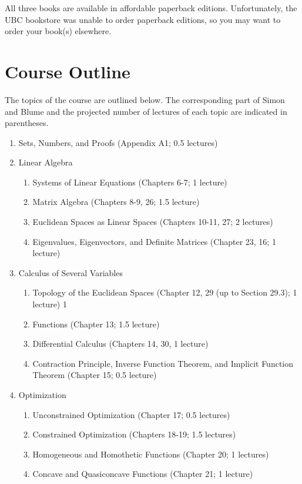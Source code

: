 \documentclass[10pt]{article}
\begin{document}
All three books are available in affordable paperback
editions. Unfortunately, the UBC bookstore was unable to order
paperback editions, so you may want to order your book(s) elsewhere. 

\section{Course Outline}

The topics of the course are outlined below. The corresponding part of
Simon and Blume and the projected number of lectures of each topic are
indicated in parentheses.
\begin{enumerate}
\item Sets, Numbers, and Proofs (Appendix A1; 0.5 lectures)
\item Linear Algebra
  \begin{enumerate}
  \item Systems of Linear Equations (Chapters 6-7; 1 lecture)
  \item Matrix Algebra (Chapters 8-9, 26; 1.5 lecture)
  \item Euclidean Spaces as Linear Spaces (Chapters 10-11, 27; 2
    lectures)
  \item Eigenvalues, Eigenvectors, and Definite Matrices (Chapter 23,
    16; 1 lecture)
  \end{enumerate}
\item Calculus of Several Variables
  \begin{enumerate}
  \item Topology of the Euclidean Spaces (Chapter 12, 29 (up to
    Section 29.3); 1 lecture) 1 
  \item Functions (Chapter 13; 1.5 lecture)
  \item Differential Calculus (Chapters 14, 30, 1 lecture)
  \item Contraction Principle, Inverse Function Theorem, and Implicit
    Function Theorem (Chapter 15; 0.5 lecture)
  \end{enumerate}
\item Optimization
  \begin{enumerate}
  \item Unconstrained Optimization (Chapter 17; 0.5 lectures)
  \item Constrained Optimization (Chapters 18-19; 1.5 lectures)
  \item Homogeneous and Homothetic Functions (Chapter 20; 1 lectures)
  \item Concave and Quasiconcave Functions (Chapter 21; 1 lecture)

\end{enumerate}
\end{enumerate}
\end{document}
